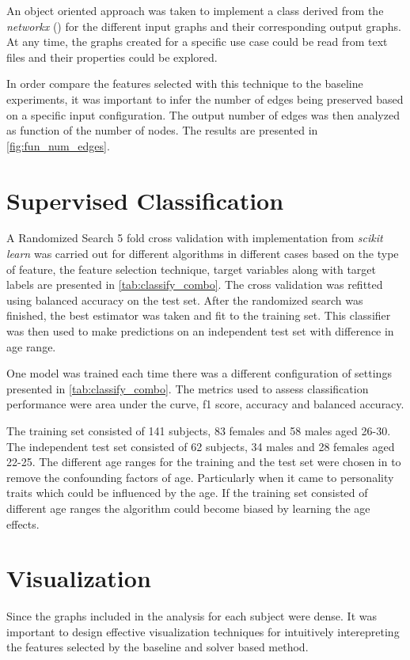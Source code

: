 \documentclass[msthesis.tex]{subfiles}
\begin{document}
An object oriented approach was taken to implement a class derived from the \textit{networkx} (\cite{hagberg2008exploring}) for the different input graphs and their corresponding output graphs. At any time, the graphs created for a specific use case could be read from text files and their properties could be explored.

In order compare the features selected with this technique to the baseline experiments, it was important to infer the number of edges being preserved based on a specific input configuration. The output number of edges was then analyzed as function of the number of nodes. The results are presented in \autoref{fig:fun_num_edges}.


\section{Supervised Classification}

A Randomized Search 5 fold cross validation with implementation from \textit{scikit learn} was carried out for different algorithms in different cases based on the type of feature, the feature selection technique, target variables along with target labels are presented in \autoref{tab:classify_combo}. The cross validation was refitted using balanced accuracy on the test set. After the randomized search was finished, the best estimator was taken and fit to the training set. This classifier was then used to make predictions on an independent test set with difference in age range.

One model was trained each time there was a different configuration of settings presented in \autoref{tab:classify_combo}. The metrics used to assess classification performance were area under the curve, f1 score, accuracy and balanced accuracy.

The training set consisted of 141 subjects, 83 females and 58 males aged 26-30. The independent test set consisted of 62 subjects, 34 males and 28 females aged 22-25. The different age ranges for the training and the test set were chosen in to remove the confounding factors of age. Particularly when it came to personality traits which could be influenced by the age. If the training set consisted of different age ranges the algorithm could become biased by learning the age effects.


\section{Visualization}
Since the graphs included in the analysis for each subject were dense. It was important to design effective visualization techniques for intuitively interepreting the features selected by the baseline and solver based method. 
\end{document}
